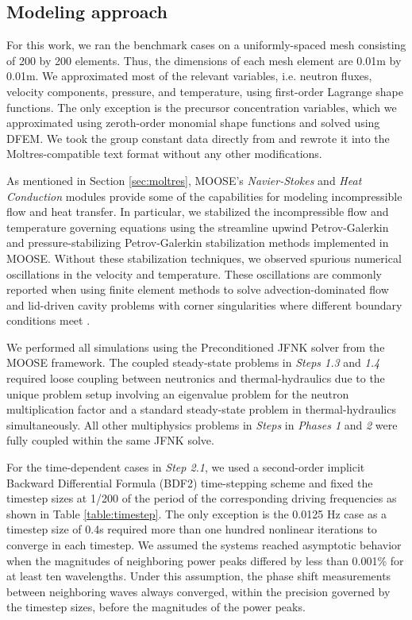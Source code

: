 \subsection{Modeling approach}

For this work, we ran the benchmark cases on a uniformly-spaced mesh consisting
of 200 by 200 elements. Thus, the dimensions of each mesh element are 0.01m by
0.01m. We
approximated most of the relevant variables, i.e. neutron fluxes, velocity
components, pressure, and temperature, using first-order Lagrange shape
functions. The only exception is the precursor concentration variables, which
we approximated using zeroth-order monomial shape functions and solved using
\gls{DFEM}. We took the group constant data directly from
\cite{tiberga_results_2020} and rewrote it into the Moltres-compatible text
format without any other modifications.

As mentioned in Section \ref{sec:moltres}, \gls{MOOSE}'s \textit{Navier-Stokes}
and \textit{Heat Conduction} modules provide some of the capabilities for
modeling incompressible flow and heat transfer. In particular, we stabilized
the incompressible flow and temperature governing equations using the
streamline upwind Petrov-Galerkin and pressure-stabilizing Petrov-Galerkin
stabilization methods \citep{peterson_overview_2017} implemented in
\gls{MOOSE}. Without these stabilization techniques, we observed spurious
numerical oscillations in the velocity and temperature. These oscillations are
commonly reported when using finite element methods to solve
advection-dominated flow and lid-driven cavity problems with corner
singularities where different boundary conditions meet
\citep{kuhlmann_lid-driven_2018}.

We performed all simulations using the Preconditioned \gls{JFNK} solver from
the \gls{MOOSE} framework. The coupled steady-state problems in
\textit{Steps 1.3} and \textit{1.4} required loose coupling between neutronics
and thermal-hydraulics due to the unique problem setup involving an eigenvalue
problem for the neutron multiplication factor and a standard steady-state
problem in thermal-hydraulics simultaneously. All other multiphysics problems
in \textit{Steps} in \textit{Phases 1} and \textit{2} were fully coupled
within the same \gls{JFNK} solve.

For the time-dependent cases in \textit{Step 2.1}, we used a second-order
implicit Backward Differential Formula (BDF2) time-stepping scheme and fixed
the timestep sizes at 1/200 of the period of the corresponding driving
frequencies as shown in Table \ref{table:timestep}. The only exception is the
0.0125 Hz case as a timestep size of 0.4s required more than one hundred
nonlinear iterations to converge in each timestep. We assumed the systems
reached asymptotic behavior when the magnitudes of neighboring power peaks
differed by less than 0.001\% for at least ten wavelengths. Under this
assumption, the phase shift
measurements between neighboring waves always converged, within the precision
governed by the timestep sizes, before the magnitudes of the power peaks.

